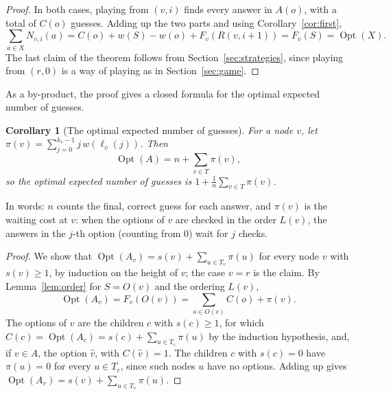 \documentclass[11pt]{article}
\newtheorem{corollary}[theorem]{Corollary}
\newcommand{\Opt}{\operatorname{Opt}}
\begin{document}
\begin{proof}
  In both cases, playing from $(v, i)$ finds every answer in $A(o)$, with a total
  of $C(o)$ guesses. Adding up the two parts and using
  Corollary~\ref{cor:first},
  \[
    \sum_{a \in X} N_{v,i}(a) = C(o) + w(S) - w(o) + F_v(R(v, i + 1))
    = F_v(S) = \Opt(X).
  \]
  The last claim of the theorem follows from Section~\ref{sec:strategies}, since
  playing from $(r, 0)$ is a way of playing as in Section~\ref{sec:game}.
\end{proof}

As a by-product, the proof gives a closed formula for the optimal expected number
of guesses.

\begin{corollary}[The optimal expected number of guesses]
  For a node $v$, let $\pi(v) = \sum_{j=0}^{k_v - 1} j \, w(\ell_v(j))$. Then
  \[
    \Opt(A) = n + \sum_{v \in T} \pi(v),
  \]
  so the optimal expected number of guesses is
  $1 + \frac{1}{n} \sum_{v \in T} \pi(v)$.
\end{corollary}

In words: $n$ counts the final, correct guess for each answer, and $\pi(v)$ is the
waiting cost at $v$: when the options of $v$ are checked in the order $L(v)$, the
answers in the $j$-th option (counting from $0$) wait for $j$ checks.

\begin{proof}
  We show that $\Opt(A_v) = s(v) + \sum_{u \in T_v} \pi(u)$ for every node $v$
  with $s(v) \ge 1$, by induction on the height of $v$; the case $v = r$ is the
  claim. By Lemma~\ref{lem:order} for $S = O(v)$ and the ordering $L(v)$,
  \[
    \Opt(A_v) = F_v(O(v)) = \sum_{o \in O(v)} C(o) + \pi(v).
  \]
  The options of $v$ are the children $c$ with $s(c) \ge 1$, for which
  $C(c) = \Opt(A_c) = s(c) + \sum_{u \in T_c} \pi(u)$ by the induction
  hypothesis, and, if $v \in A$, the option $\hat v$, with $C(\hat v) = 1$. The
  children $c$ with $s(c) = 0$ have $\pi(u) = 0$ for every $u \in T_c$, since
  such nodes $u$ have no options. Adding up gives
  $\Opt(A_v) = s(v) + \sum_{u \in T_v} \pi(u)$.
\end{proof}
\end{document}
